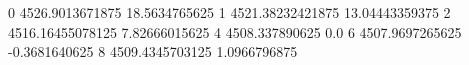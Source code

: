 0 4526.9013671875 18.5634765625
1 4521.38232421875 13.04443359375
2 4516.16455078125 7.82666015625
4 4508.337890625 0.0
6 4507.9697265625 -0.3681640625
8 4509.4345703125 1.0966796875

